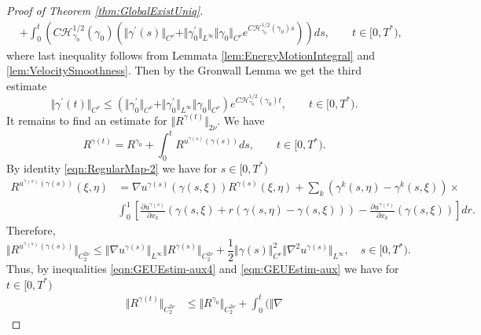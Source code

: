 \documentclass[11pt,a4paper,reqno]{amsart}%
\newcommand\half{\frac12}
\theoremstyle{plain}
\theoremstyle{remark}
\theoremstyle{plain}
\numberwithin{equation}{section}
\def\suml{\sum\limits}
\begin{document}
\begin{proof}[Proof of Theorem \ref{thm:GlobalExistUniq}]
\begin{align}
&+\int_0^t(C\mathcal{H}_{\gamma_0}^{1/2}(\gamma_0)(\Vert \gamma^\prime(s)\Vert_{C^{\nu}}+\Vert \gamma^\prime_0\Vert_{L^{\infty}}\Vert \gamma_0\Vert_{C^{\nu}}e^{C\mathcal{H}_{\gamma_0}^{1/2}(\gamma_0)s}))ds,\qquad t\in[0,T^*),
\end{align}
where last inequality follows from Lemmata
\ref{lem:EnergyMotionIntegral} and \ref{lem:VelocitySmoothness}.
Then by the Gronwall Lemma we get the third estimate
\begin{equation}
\Vert \gamma^\prime(t)\Vert_{C^{\nu}}\leq(\Vert \gamma^\prime_0\Vert_{C^{\nu}}+\Vert \gamma^\prime_0\Vert_{L^{\infty}}\Vert \gamma_0\Vert_{C^{\nu}})e^{C\mathcal{H}_{\gamma_0}^{1/2}(\gamma_0)t},\qquad t\in[0,T^*).\label{eqn:GEUEstim-3}
\end{equation}
It remains to find an estimate for $\Vert R^{\gamma(t)}\Vert_{2\nu}$. We
have
\begin{equation}
R^{\gamma(t)}=R^{\gamma_0}+\int_0^tR^{u^{\gamma(s)}(\gamma(s))}ds,\qquad t\in[0,T^*).
\end{equation}
By identity \eqref{eqn:RegularMap-2} we have for $s\in[0,T^*)$
\begin{align}
R^{u^{\gamma(s)}(\gamma(s))}(\xi,\eta)&=\nabla
u^{\gamma(s)}(\gamma(s,\xi))R^{\gamma(s)}(\xi,\eta)+
\suml_k(\gamma^k(s,\eta)-\gamma^k(s,\xi))\times\nonumber\\
&\int_0^1\left[\frac{\partial u^{\gamma(s)}}{\partial
x_k}(\gamma(s,\xi)+r(\gamma(s,\eta)-\gamma(s,\xi)))-\frac{\partial
u^{\gamma(s)}}{\partial
x_k}(\gamma(s,\xi))\right]dr.\label{eqn:GEUEstim-aux3}
\end{align}
Therefore,
\begin{equation}
\Vert R^{u^{\gamma(s)}(\gamma(s))}\Vert_{{C}_2^{2\nu}}\leq \Vert \nabla
u^{\gamma(s)}\Vert_{L^{\infty}}\Vert R^{\gamma(s)}\Vert_{{C}_2^{2\nu}}+\frac{1}{2}\Vert \gamma(s)\Vert_{C^{\nu}}^2\Vert \nabla^2
u^{\gamma(s)}\Vert_{L^{\infty}},\quad s\in[0,T^*).\label{eqn:GEUEstim-aux4}
\end{equation}
Thus, by inequalities \eqref{eqn:GEUEstim-aux4} and
\eqref{eqn:GEUEstim-aux} we have for $t\in[0,T^*)$
\begin{align}
\Vert R^{\gamma(t)}\Vert_{{C}_2^{2\nu}}&\leq\Vert R^{\gamma_0}\Vert_{{C}_2^{2\nu}}+\int_0^t(\Vert \nabla

\end{align}
\end{proof}
\end{document}
